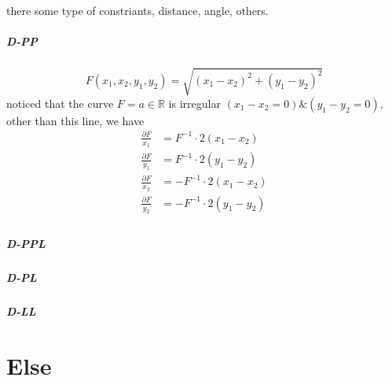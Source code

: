 \documentclass[UTF8]{../09-Mathematics}
\begin{document}
there some type of constriants, distance, angle, others.

\paragraph{D-PP}
$$
F(x_1, x_2, y_1,y_2) = \sqrt{(x_1 - x_2)^2 + (y_1 - y_2)^2}
$$
noticed that the curve $F = a \in \mathbb R$ is irregular $(x_1 - x_2 = 0) \& (y_1 - y_2 = 0) $, other than this line, we have
$$
\begin{aligned}
\frac{\partial F}{x_1} &= F^{-1}\cdot 2(x_1 - x_2)\\
\frac{\partial F}{y_1} &= F^{-1}\cdot 2(y_1 - y_2) \\
\frac{\partial F}{x_2} &= -F^{-1}\cdot 2(x_1 - x_2) \\
\frac{\partial F}{y_2} &= -F^{-1}\cdot 2(y_1 - y_2) \\
\end{aligned}
$$

\paragraph{D-PPL}

\paragraph{D-PL}

\paragraph{D-LL}





\chapter{Else}
\end{document}
